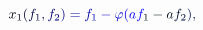 \documentclass[12pt]{article}
\begin{document}
\makeatletter
\renewcommand*{\@textcolor}[3]{%
  \protect\leavevmode
  \begingroup
    \color#1{#2}#3%
  \endgroup
}
\makeatother
\begin{displaymath}
\mathcolor[RGB]{0,0,15}{x} _ { \mathcolor[RGB]{0,0,30}{1} } \mathcolor[RGB]{0,0,45}{(} \mathcolor[RGB]{0,0,60}{f} _ { \mathcolor[RGB]{0,0,75}{1} } \mathcolor[RGB]{0,0,90}{,} \mathcolor[RGB]{0,0,105}{f} _ { \mathcolor[RGB]{0,0,120}{2} } \mathcolor[RGB]{0,0,135}{)} \mathcolor[RGB]{0,0,150}{=} \mathcolor[RGB]{0,0,165}{f} _ { \mathcolor[RGB]{0,0,180}{1} } \mathcolor[RGB]{0,0,195}{-} \mathcolor[RGB]{0,0,210}{\varphi} \mathcolor[RGB]{0,0,225}{(} \mathcolor[RGB]{0,0,240}{a} \mathcolor[RGB]{0,0,255}{f} _ { \mathcolor[RGB]{0,15,0}{1} } \mathcolor[RGB]{0,15,15}{-} \mathcolor[RGB]{0,15,30}{a} \mathcolor[RGB]{0,15,45}{f} _ { \mathcolor[RGB]{0,15,60}{2} } \mathcolor[RGB]{0,15,75}{)} \mathcolor[RGB]{0,15,90}{,} \,
\end{displaymath}
\end{document}
